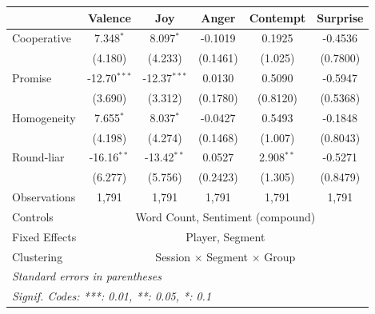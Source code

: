 \begingroup
\centering
\begin{tabular}{lccccc}
\tabularnewline \midrule \midrule
& Valence & Joy & Anger & Contempt & Surprise \\
\midrule
Cooperative & 7.348$^{*}$ & 8.097$^{*}$ & -0.1019 & 0.1925 & -0.4536 \\
& (4.180) & (4.233) & (0.1461) & (1.025) & (0.7800) \\
\addlinespace
Promise & -12.70$^{***}$ & -12.37$^{***}$ & 0.0130 & 0.5090 & -0.5947 \\
& (3.690) & (3.312) & (0.1780) & (0.8120) & (0.5368) \\
\addlinespace
Homogeneity & 7.655$^{*}$ & 8.037$^{*}$ & -0.0427 & 0.5493 & -0.1848 \\
& (4.198) & (4.274) & (0.1468) & (1.007) & (0.8043) \\
\addlinespace
Round-liar & -16.16$^{**}$ & -13.42$^{**}$ & 0.0527 & 2.908$^{**}$ & -0.5271 \\
& (6.277) & (5.756) & (0.2423) & (1.305) & (0.8479) \\
\addlinespace
\midrule
Observations & 1,791 & 1,791 & 1,791 & 1,791 & 1,791 \\
Controls & \multicolumn{5}{c}{Word Count, Sentiment (compound)} \\
Fixed Effects & \multicolumn{5}{c}{Player, Segment} \\
Clustering & \multicolumn{5}{c}{Session $\times$ Segment $\times$ Group} \\
\midrule \midrule
\multicolumn{6}{l}{\emph{Standard errors in parentheses}} \\
\multicolumn{6}{l}{\emph{Signif. Codes: ***: 0.01, **: 0.05, *: 0.1}} \\
\end{tabular}
\par\endgroup
